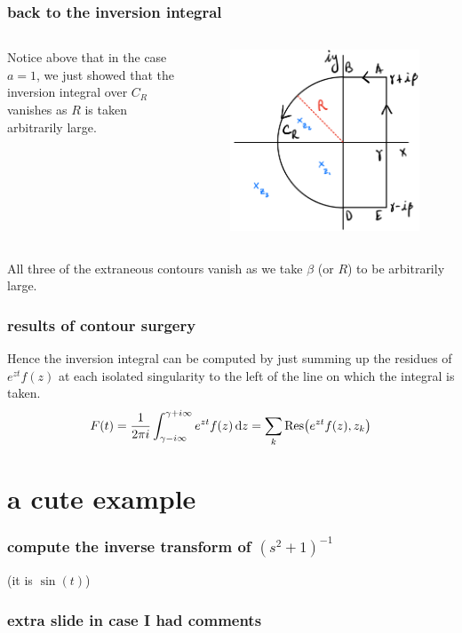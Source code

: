 \documentclass[mathserif]{beamer}
\newcommand{\br}[1]{\left(#1\right)}
\begin{document}
\begin{frame}
  \frametitle{back to the inversion integral}

  \begin{columns}
    Notice above that in the case $a=1$, we just showed that the inversion integral over $C_R$ vanishes as $R$ is taken arbitrarily large.
      \begin{figure}[h]
        \centering
        \includegraphics[scale=0.25]{3}
      \end{figure}
    \end{columns}

  All three of the extraneous contours vanish as we take $\beta$ (or $R$) to be arbitrarily large.

\end{frame}

\begin{frame}
  \frametitle{results of contour surgery}

  Hence the inversion integral can be computed by just summing up the residues of $e^{zt}f(z)$ at each isolated singularity to the left of the line on which the integral is taken. \[F(t) = \frac{1}{2\pi i}\int_{\gamma-i\infty}^{\gamma+i\infty} e^{zt}f(z)\dd{z} = \sum_k \Res(e^{zt}f(z), z_k)\]

\end{frame}

\section{a cute example}

\begin{frame}
  \frametitle{compute the inverse transform of $\br{s^2+1}^{-1}$}

  (it is $\sin(t)$)\vspace{7cm}

\end{frame}

\begin{frame}
  \frametitle{extra slide in case I had comments}

  

\end{frame}
\end{document}
